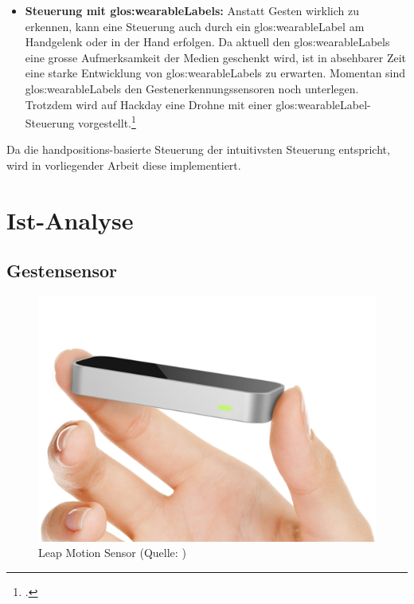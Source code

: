 \begin{itemize}
	\item \textbf{Steuerung mit \glspl{glos:wearableLabel}:}
	Anstatt Gesten wirklich zu erkennen, kann eine Steuerung auch durch ein \gls{glos:wearableLabel} am Handgelenk oder in der Hand erfolgen.
	Da aktuell den \glspl{glos:wearableLabel} eine grosse Aufmerksamkeit der Medien geschenkt wird, ist in absehbarer Zeit eine starke Entwicklung von \glspl{glos:wearableLabel} zu erwarten.
	Momentan sind \glspl{glos:wearableLabel} den Gestenerkennungssensoren noch unterlegen.
	Trotzdem wird auf Hackday eine Drohne mit einer \gls{glos:wearableLabel}-Steuerung vorgestellt.\footcite{Wearable_Gesture_Controlled_Drone_Hackaday_2015-04-29}
\end{itemize}

Da die handpositions-basierte Steuerung der intuitivsten Steuerung entspricht, wird in vorliegender Arbeit diese implementiert.



\clearpage
\section{Ist-Analyse}

\subsection{Gestensensor} \label{subsec:leapmotion}
\begin{figure}
	\includegraphics[width=1.0\linewidth]{images/analysis/leap_simple.png}
	\caption[Leap Motion Sensor]{Leap Motion Sensor (Quelle: )}
\end{figure}


